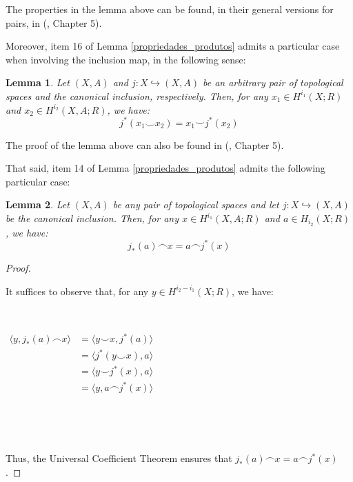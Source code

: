 \documentclass[12pt,oneside]{book}
\newtheorem{lem}    {Lemma}[chapter]
\newcommand{\ccup}{\smile}
\newcommand{\ccap}{\frown}
\begin{document}
    The properties in the lemma above can be found, in their general versions for pairs, in 
    (\cite{spanier}, Chapter 5).
    
    Moreover, item 16 of Lemma \ref{propriedades_produtos} admits a particular case when involving the 
    inclusion map, in the following sense:
    
    \begin{lem}\label{propriedades_produtos_2}
        Let $(X,A)$ and $j:X\hookrightarrow (X,A)$ be an arbitrary pair of topological spaces and the 
        canonical inclusion, respectively. Then, for any $x_{1}\in H^{i_{1}}(X;R)$ and $x_{2}\in H^{i_{2}}(X,A;R)$, 
        we have:
        $$ j^{*}(x_{1}\ccup x_{2})=x_{1}\ccup j^{*}(x_{2}) $$
    \end{lem}
    
    The proof of the lemma above can also be found in (\cite{spanier}, Chapter 5).
    
    That said, item 14 of Lemma \ref{propriedades_produtos} admits the following particular case:

    \begin{lem}\label{propriedades_produtos_3}
        Let $(X,A)$ be any pair of topological spaces and let $j:X\hookrightarrow (X,A)$ be the canonical inclusion. Then, for any 
        $x\in H^{i_{1}}(X,A;R)$ and $a\in H_{i_{2}}(X;R)$, we have:
        $$
        j_{*}(a)\ccap x = a\ccap j^{*}(x)
        $$
    \end{lem}
    
    \begin{proof}

        \

        It suffices to observe that, for any $y\in H^{i_{2}-i_{1}}(X;R)$, we have:

        \
        
        $\begin{array}{rl}
            \langle y, j_{*}(a)\ccap x \rangle & = \langle y\ccup x, j^{*}(a) \rangle \\
            & = \langle j^{*}(y\ccup x), a \rangle \\
            & = \langle y\ccup j^{*}(x), a \rangle \\
            & = \langle y, a\ccap j^{*}(x) \rangle
        \end{array}$

        \

        \
    
        Thus, the Universal Coefficient Theorem ensures that $j_{*}(a)\ccap x = a\ccap j^{*}(x)$.
    \end{proof}
    
\end{document}

